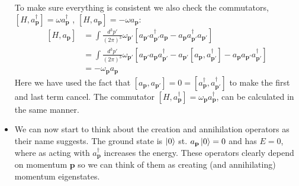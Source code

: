 \documentclass[11pt]{article}
\numberwithin{equation}{section}
\begin{document}
\begin{itemize}
   To make sure everything is consistent we also check the commutators, $[H,a_{\textbf{p}}^{\dagger}] = \omega a^{\dagger}_{\textbf{p}}$ , $[H,a_{\textbf{p}}] = -\omega a_{\textbf{p}}$:
   \begin{equation*}
      \begin{split}
        [H,a_{\textbf{p}}] & = \int \frac{d^3p'}{(2\pi)^3}\omega_{\textbf{p}'}\left[a_{\textbf{p}'}a^{\dagger}_{\textbf{p}'}a_{\textbf{p}}-a_{\textbf{p}}a^{\dagger}_{\textbf{p}'}a_{\textbf{p}'}\right] \\
        & = \int \frac{d^3p'}{(2\pi)^3}\omega_{\textbf{p}'}\left[a_{\textbf{p}'}a_{\textbf{p}}a^{\dagger}_{\textbf{p}'}-a_{\textbf{p}'}[a_{\textbf{p}},a^{\dagger}_{\textbf{p}'}]-a_{\textbf{p}}a_{\textbf{p}'}a^{\dagger}_{\textbf{p}'}\right] \\
        & = -\omega_{\textbf{p}}a_{\textbf{p}} 
      \end{split}
   \end{equation*}
   Here we have used the fact that $[a_{\textbf{p}},a_{\textbf{p}'}]= 0 = [a^{\dagger}_{\textbf{p}},a^{\dagger}_{\textbf{p}'}]$ to make the first and last term cancel. The commutator $[H,a^{\dagger}_{\textbf{p}}]=\omega_{\textbf{p}}a^{\dagger}_{\textbf{p}}$, can be calculated in the same manner.

   \item We can now start to think about the creation and annihilation operators as their name suggests. The ground state is $\ket{0}$ st. $a_{\textbf{p}}\ket{0} = 0$ and has $E=0$, where as acting with $a^{\dagger}_{\textbf{p}}$ increases the energy. These operators clearly depend on momentum $\textbf{p}$ so we can think of them as creating (and annihilating) momentum eigenstates. 
\end{itemize}
\end{document}
